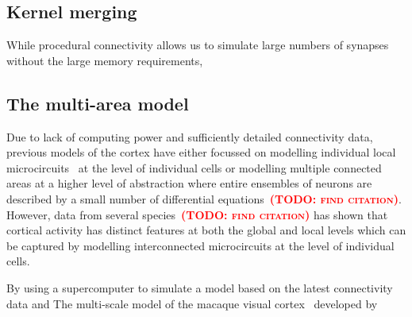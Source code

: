 \documentclass[9pt,twocolumn,twoside,lineno]{pnas-new}
\newcommand{\todo}[1]{\textbf{\textsc{\textcolor{red}{(TODO: #1)}}}}
\begin{document}
\subsection*{Kernel merging}
While procedural connectivity allows us to simulate large numbers of synapses without the large memory requirements,

\subsection*{The multi-area model}
Due to lack of computing power and sufficiently detailed connectivity data, previous models of the cortex have either focussed on modelling individual local microcircuits~\citep{Izhikevich2008,Potjans2012} at the level of individual cells or modelling multiple connected areas at a higher level of abstraction where entire ensembles of neurons are described by a small number of differential equations~\todo{find citation}.
However, data from several species~\todo{find citation} has shown that cortical activity has distinct features at both the global and local levels which can be captured by modelling interconnected microcircuits at the level of individual cells.

By using a supercomputer to simulate a model based on the latest connectivity data and The multi-scale model of the macaque visual cortex~\citep{Schmidt2018} developed by 
\end{document}
